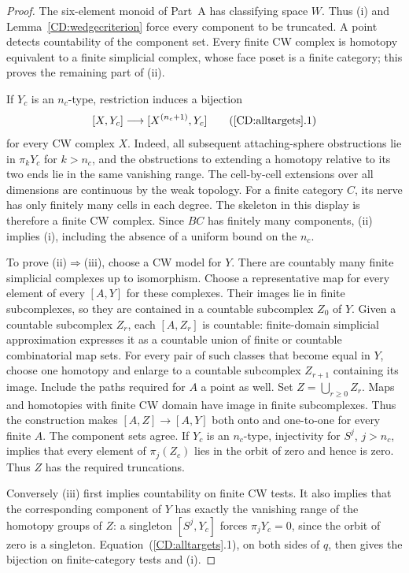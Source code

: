\begin{proof}
The six-element monoid of Part~A has classifying space $W$.
Thus (i) and Lemma~\ref{CD:wedgecriterion} force every component to be
truncated.  A point detects countability of the component set.
Every finite CW complex is homotopy equivalent to a finite simplicial
complex, whose face poset is a finite category; this proves the remaining
part of (ii).

If $Y_c$ is an $n_c$-type, restriction induces a bijection
\[
 [X,Y_c]\longrightarrow[X^{(n_c+1)},Y_c]
 \tag{\ref{CD:alltargets}.1}
\]
for every CW complex $X$.  Indeed, all subsequent attaching-sphere
obstructions lie in $\pi_kY_c$ for $k>n_c$, and the obstructions to
extending a homotopy relative to its two ends lie in the same vanishing
range.  The cell-by-cell extensions over all dimensions are continuous
by the weak topology.  For a finite category $C$, its nerve has only
finitely many cells in each degree.  The skeleton in this display is
therefore a finite CW complex.  Since $BC$ has finitely many components,
(ii) implies (i), including the absence of a uniform bound on the $n_c$.

To prove (ii)$\Rightarrow$(iii), choose a CW model for $Y$.
There are countably many finite simplicial complexes up to isomorphism.
Choose a representative map for every element of every $[A,Y]$ for
these complexes.  Their images lie in finite subcomplexes, so they are
contained in a countable subcomplex $Z_0$ of $Y$.
Given a countable subcomplex $Z_r$, each $[A,Z_r]$ is countable:
finite-domain simplicial approximation expresses it as a countable
union of finite or countable combinatorial map sets.
For every pair of such classes that become equal in $Y$, choose one
homotopy and enlarge to a countable subcomplex $Z_{r+1}$ containing its
image.  Include the paths required for $A$ a point as well.
Set $Z=\bigcup_{r\ge0}Z_r$.  Maps and homotopies with finite CW domain
have image in finite subcomplexes.  Thus the construction makes
$[A,Z]\to[A,Y]$ both onto and one-to-one for every finite $A$.
The component sets agree.  If $Y_c$ is an $n_c$-type, injectivity for
$S^j$, $j>n_c$, implies that every element of $\pi_j(Z_c)$ lies in the
orbit of zero and hence is zero.  Thus $Z$ has the required truncations.

Conversely (iii) first implies countability on finite CW tests.
It also implies that the corresponding component of $Y$ has exactly
the vanishing range of the homotopy groups of $Z$: a singleton
$[S^j,Y_c]$ forces $\pi_jY_c=0$, since the orbit of zero is a singleton.
Equation~(\ref{CD:alltargets}.1), on both sides of $q$, then gives the
bijection on finite-category tests and (i).
\end{proof}

